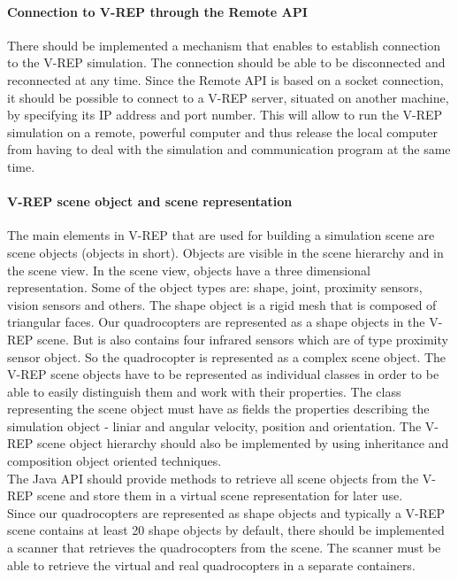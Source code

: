 \paragraph{Connection to V-REP through the Remote API}

There should be implemented a mechanism that enables to establish connection to the V-REP simulation. The connection should be able to be disconnected and reconnected at any time. Since the Remote API is based on a socket connection, it should be possible to connect to a V-REP server, situated on another machine, by specifying its IP address and port number. This will allow to run the V-REP simulation on a remote, powerful computer and thus release the local computer from having to deal with the simulation and communication program at the same time.

\paragraph{V-REP scene object and scene representation}\label{sceneobject}
The main elements in V-REP that are used for building a simulation scene are scene objects (objects in short). Objects are visible in the scene hierarchy and in the scene view. In the scene view, objects have a three dimensional representation. Some of the object types are: shape, joint, proximity sensors, vision sensors and others. The shape object is a rigid mesh that is composed of triangular faces. Our quadrocopters are represented as a shape objects in the V-REP scene. But is also contains four infrared sensors which are of type proximity sensor object. So the quadrocopter is represented as a complex scene object. 
The V-REP scene objects have to be represented as individual classes in order to be able to easily distinguish them and work with their properties. The class representing the scene object must have as fields the properties describing the simulation object - liniar and angular velocity, position and orientation. The V-REP scene object hierarchy should also be implemented by using inheritance and composition object oriented techniques. \\
The Java API should provide methods to retrieve all scene objects from the V-REP scene and store them in a virtual scene representation for later use.\\
Since our quadrocopters are represented as shape objects and typically a V-REP scene contains at least 20 shape objects by default, there should be implemented a scanner that retrieves the quadrocopters from the scene. The scanner must be able to retrieve the virtual and real quadrocopters in a separate containers.

